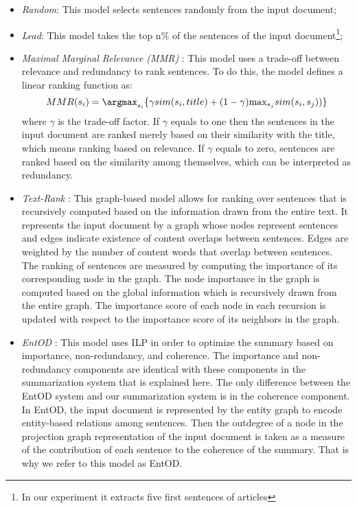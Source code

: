 \begin{itemize}
	\item \emph{Random}: This model selects sentences randomly from the input document;

	\item \emph{Lead}: This model takes the top n\% of the sentences of the input document\footnote{In our experiment it extracts five first sentences of articles};

	\item \emph{Maximal Marginal Relevance (MMR)} \cite{carbonell98}: This model uses a \mbox{trade-off} between relevance and redundancy to rank sentences. 
	 To do this, the model defines a linear ranking function as:
	 \begin{equation}
	 MMR(s_i) = \mathtt{\argmax}_{s_i}\lbrace \gamma sim(s_i,title) + (1-\gamma)\mathtt{\max}_{s_j}sim(s_i,s_j)) \rbrace 
	 \end{equation} 
	 where $\gamma$ is the trade-off factor. 
	 If $\gamma$ equals to one then the sentences in the input document are ranked merely based on their similarity with the title, which means ranking based on relevance. 
	 If $\gamma$ equals to zero, sentences are ranked based on the similarity among themselves, which can be interpreted as redundancy. 

	\item \emph{Text-Rank} \cite{mihalcea04b}: This graph-based model allows for ranking over sentences that is recursively computed based on the information drawn from the entire text. 
	It represents the input document by a graph whose nodes represent sentences and edges indicate existence of content overlaps between sentences. 
	Edges are weighted by the number of content words that overlap between sentences. 
	The ranking of sentences are measured by computing the importance of its corresponding node in the graph. 
	The node importance in the graph is computed based on the global information which is recursively drawn from the entire graph. 
	The importance score of each node in each recursion is updated with respect to the importance score of its neighbors in the graph. 
	
	\item \emph{EntOD} \cite{parveen15a}: 
	This model uses ILP in order to optimize the summary based on importance, non-redundancy, and coherence. 
	The importance and non-redundancy components are identical with these components in the summarization system that is explained here. 
	The only difference between the EntOD system and our summarization system is in the coherence component. 
	In EntOD, the input document is represented by the entity graph to encode \mbox{entity-based} relations among sentences. 
	Then the outdegree of a node in the projection graph representation of the input document is taken as a measure of the contribution of each sentence to the coherence of the summary. 
	That is why we refer to this model as EntOD. 


\end{itemize}
